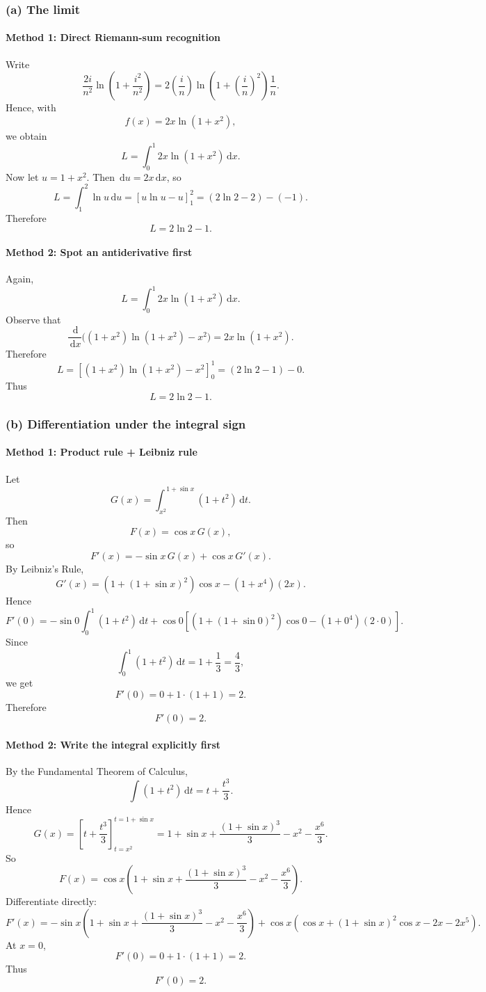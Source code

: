 \documentclass[12pt]{article}
\newcommand{\dd}{\,\mathrm{d}}
\begin{document}
\subsubsection{(a) The limit}

\paragraph{Method 1: Direct Riemann-sum recognition}
Write
\[
\frac{2i}{n^2}\ln\!\left(1+\frac{i^2}{n^2}\right)
=
2\left(\frac{i}{n}\right)\ln\!\left(1+\left(\frac{i}{n}\right)^2\right)\frac{1}{n}.
\]
Hence, with
\[
f(x)=2x\ln(1+x^2),
\]
we obtain
\[
L=\int_0^1 2x\ln(1+x^2)\dd x.
\]
Now let \(u=1+x^2\). Then \(\dd u=2x\dd x\), so
\[
L=\int_1^2 \ln u \dd u
=
\left[u\ln u-u\right]_1^2
=
(2\ln2-2)-(-1).
\]
Therefore
\[
\boxed{L=2\ln2-1.}
\]

\paragraph{Method 2: Spot an antiderivative first}
Again,
\[
L=\int_0^1 2x\ln(1+x^2)\dd x.
\]
Observe that
\[
\frac{\dd}{\dd x}\Big((1+x^2)\ln(1+x^2)-x^2\Big)=2x\ln(1+x^2).
\]
Therefore
\[
L=\left[(1+x^2)\ln(1+x^2)-x^2\right]_0^1
=
(2\ln2-1)-0.
\]
Thus
\[
\boxed{L=2\ln2-1.}
\]

\bigskip

\subsubsection{(b) Differentiation under the integral sign}

\paragraph{Method 1: Product rule + Leibniz rule}
Let
\[
G(x)=\int_{x^2}^{\,1+\sin x}(1+t^2)\dd t.
\]
Then
\[
F(x)=\cos x\, G(x),
\]
so
\[
F'(x)=-\sin x\,G(x)+\cos x\,G'(x).
\]
By Leibniz's Rule,
\[
G'(x)=(1+(1+\sin x)^2)\cos x-(1+x^4)(2x).
\]
Hence
\[
F'(0)
=
-\sin 0\int_0^1(1+t^2)\dd t
+
\cos 0\left[(1+(1+\sin0)^2)\cos0-(1+0^4)(2\cdot0)\right].
\]
Since
\[
\int_0^1(1+t^2)\dd t=1+\frac13=\frac43,
\]
we get
\[
F'(0)=0+1\cdot(1+1)=2.
\]
Therefore
\[
\boxed{F'(0)=2.}
\]

\paragraph{Method 2: Write the integral explicitly first}
By the Fundamental Theorem of Calculus,
\[
\int (1+t^2)\dd t=t+\frac{t^3}{3}.
\]
Hence
\[
G(x)=\left[t+\frac{t^3}{3}\right]_{t=x^2}^{t=1+\sin x}
=
1+\sin x+\frac{(1+\sin x)^3}{3}-x^2-\frac{x^6}{3}.
\]
So
\[
F(x)=\cos x\left(1+\sin x+\frac{(1+\sin x)^3}{3}-x^2-\frac{x^6}{3}\right).
\]
Differentiate directly:
\[
F'(x)
=
-\sin x\left(1+\sin x+\frac{(1+\sin x)^3}{3}-x^2-\frac{x^6}{3}\right)
+\cos x\left(\cos x+(1+\sin x)^2\cos x-2x-2x^5\right).
\]
At \(x=0\),
\[
F'(0)=0+1\cdot(1+1)=2.
\]
Thus
\[
\boxed{F'(0)=2.}
\]
\end{document}

